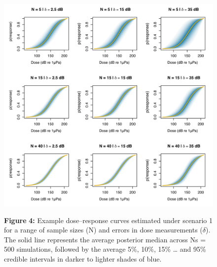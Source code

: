 \documentclass[
]{article}
\begin{document}
\begin{figure}

{\centering \includegraphics[width=1\linewidth]{fig/fig_doseresponse_S1} 

}

\textbf{Figure }{\textbf{4:} \hypertarget{fig4}{}Example dose--response curves estimated under scenario 1 for a range of sample sizes (N) and errors in dose measurements (\(\delta\)). The solid line represents the average posterior median across Ns = 500 simulations, followed by the average 5\%, 10\%, 15\% \ldots{} and 95\% credible intervals in darker to lighter shades of blue.}\label{fig:unnamed-chunk-3}
\end{figure}
\end{document}

